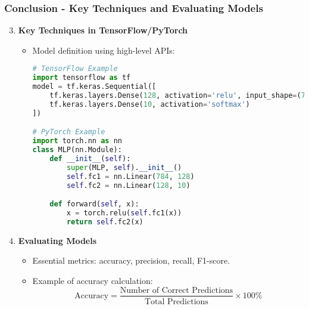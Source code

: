 \documentclass[aspectratio=169]{beamer}
\begin{document}
\begin{frame}[fragile]
    \frametitle{Conclusion - Key Techniques and Evaluating Models}
    \begin{enumerate}
        \setcounter{enumi}{2}
        \item \textbf{Key Techniques in TensorFlow/PyTorch}
        \begin{itemize}
            \item Model definition using high-level APIs:
            \begin{lstlisting}[language=python]
# TensorFlow Example
import tensorflow as tf
model = tf.keras.Sequential([
    tf.keras.layers.Dense(128, activation='relu', input_shape=(784,)),
    tf.keras.layers.Dense(10, activation='softmax')
])

# PyTorch Example
import torch.nn as nn
class MLP(nn.Module):
    def __init__(self):
        super(MLP, self).__init__()
        self.fc1 = nn.Linear(784, 128)
        self.fc2 = nn.Linear(128, 10)

    def forward(self, x):
        x = torch.relu(self.fc1(x))
        return self.fc2(x)
            \end{lstlisting}
        \end{itemize}

        \item \textbf{Evaluating Models}
        \begin{itemize}
            \item Essential metrics: accuracy, precision, recall, F1-score.
            \item Example of accuracy calculation:
            \begin{equation}
                \text{Accuracy} = \frac{\text{Number of Correct Predictions}}{\text{Total Predictions}} \times 100\%
            \end{equation}
        \end{itemize}
    \end{enumerate}
\end{frame}
\end{document}
